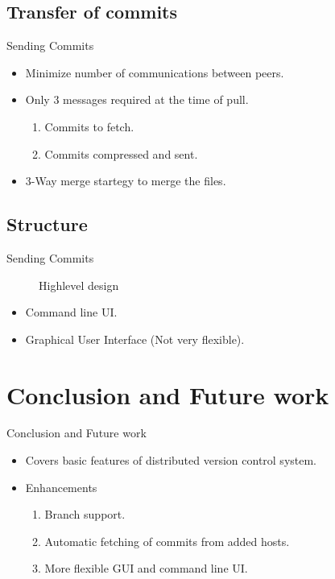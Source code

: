 \documentclass[xcolor=dvipsnames]{beamer}
\begin{document}
\subsection{Transfer of commits}
\begin{frame}{Sending Commits}
\begin{itemize}
\item Minimize number of communications between peers.
\item Only 3 messages required at the time of pull.
\begin{enumerate}
\item Commits to fetch.
\item Commits compressed and sent.
\end{enumerate}
\item 3-Way merge startegy to merge the files.
\end{itemize}
\end{frame}

\subsection{Structure}
\begin{frame}{Sending Commits}
\begin{figure}
\centering
{}
\caption{Highlevel design}
\end{figure}
\begin{itemize}
\item Command line UI.
\item Graphical User Interface (Not very flexible).
\end{itemize}
\end{frame}

\section{Conclusion and Future work}
\begin{frame}{Conclusion and Future work}
\begin{itemize}
\item Covers basic features of distributed version control system.
\item Enhancements
\begin{enumerate}
\item Branch support.
\item Automatic fetching of commits from added hosts.
\item More flexible GUI and command line UI.
\end{enumerate}
\end{itemize}


\end{frame}
\end{document}
